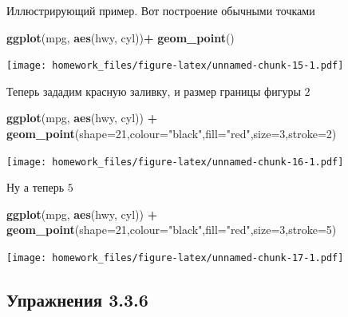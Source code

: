 \documentclass[]{book}
\newenvironment{Shaded}{\begin{snugshade}}{\end{snugshade}}
\newcommand{\KeywordTok}[1]{\textcolor[rgb]{0.13,0.29,0.53}{\textbf{#1}}}
\newcommand{\DataTypeTok}[1]{\textcolor[rgb]{0.13,0.29,0.53}{#1}}
\newcommand{\DecValTok}[1]{\textcolor[rgb]{0.00,0.00,0.81}{#1}}
\newcommand{\StringTok}[1]{\textcolor[rgb]{0.31,0.60,0.02}{#1}}
\newcommand{\OperatorTok}[1]{\textcolor[rgb]{0.81,0.36,0.00}{\textbf{#1}}}
\newcommand{\NormalTok}[1]{#1}
\begin{document}
Иллюстрирующий пример. Вот построение обычными точками

\begin{Shaded}
\begin{Highlighting}[]
\KeywordTok{ggplot}\NormalTok{(mpg, }\KeywordTok{aes}\NormalTok{(hwy, cyl))}\OperatorTok{+}
\StringTok{ }\KeywordTok{geom_point}\NormalTok{()}
\end{Highlighting}
\end{Shaded}

\texttt{[image: homework\_files/figure-latex/unnamed-chunk-15-1.pdf]}

Теперь зададим красную заливку, и размер границы фигуры \(2\)

\begin{Shaded}
\begin{Highlighting}[]
\KeywordTok{ggplot}\NormalTok{(mpg, }\KeywordTok{aes}\NormalTok{(hwy, cyl)) }\OperatorTok{+}
\StringTok{ }\KeywordTok{geom_point}\NormalTok{(}\DataTypeTok{shape=}\DecValTok{21}\NormalTok{,}\DataTypeTok{colour=}\StringTok{"black"}\NormalTok{,}\DataTypeTok{fill=}\StringTok{"red"}\NormalTok{,}\DataTypeTok{size=}\DecValTok{3}\NormalTok{,}\DataTypeTok{stroke=}\DecValTok{2}\NormalTok{)}
\end{Highlighting}
\end{Shaded}

\texttt{[image: homework\_files/figure-latex/unnamed-chunk-16-1.pdf]}

Ну а теперь \(5\)

\begin{Shaded}
\begin{Highlighting}[]
\KeywordTok{ggplot}\NormalTok{(mpg, }\KeywordTok{aes}\NormalTok{(hwy, cyl)) }\OperatorTok{+}
\StringTok{ }\KeywordTok{geom_point}\NormalTok{(}\DataTypeTok{shape=}\DecValTok{21}\NormalTok{,}\DataTypeTok{colour=}\StringTok{"black"}\NormalTok{,}\DataTypeTok{fill=}\StringTok{"red"}\NormalTok{,}\DataTypeTok{size=}\DecValTok{3}\NormalTok{,}\DataTypeTok{stroke=}\DecValTok{5}\NormalTok{)}
\end{Highlighting}
\end{Shaded}

\texttt{[image: homework\_files/figure-latex/unnamed-chunk-17-1.pdf]}

\subsection*{Упражнения 3.3.6}\label{-3.3.6}
\end{document}
